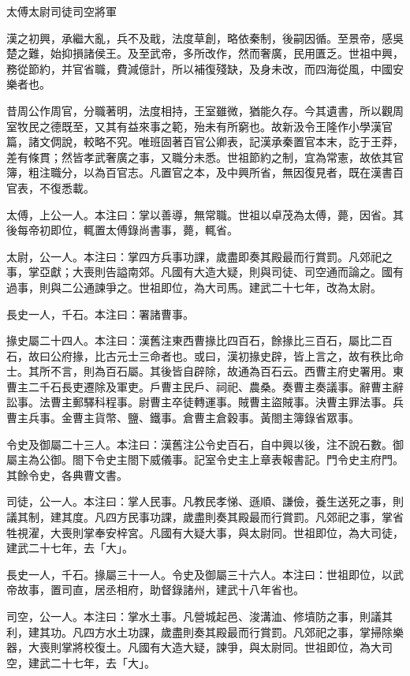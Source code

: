 
\begin{pinyinscope}
太傅太尉司徒司空將軍

漢之初興，承繼大亂，兵不及戢，法度草創，略依秦制，後嗣因循。至景帝，感吳楚之難，始抑損諸侯王。及至武帝，多所改作，然而奢廣，民用匱乏。世祖中興，務從節約，并官省職，費減億計，所以補復殘缺，及身未改，而四海從風，中國安樂者也。

昔周公作周官，分職著明，法度相持，王室雖微，猶能久存。今其遺書，所以觀周室牧民之德既至，又其有益來事之範，殆未有所窮也。故新汲令王隆作小學漢官篇，諸文倜說，較略不究。唯班固著百官公卿表，記漢承秦置官本末，訖于王莽，差有條貫；然皆孝武奢廣之事，又職分未悉。世祖節約之制，宜為常憲，故依其官簿，粗注職分，以為百官志。凡置官之本，及中興所省，無因復見者，既在漢書百官表，不復悉載。

太傅，上公一人。本注曰：掌以善導，無常職。世祖以卓茂為太傅，薨，因省。其後每帝初即位，輒置太傅錄尚書事，薨，輒省。

太尉，公一人。本注曰：掌四方兵事功課，歲盡即奏其殿最而行賞罰。凡郊祀之事，掌亞獻；大喪則告謚南郊。凡國有大造大疑，則與司徒、司空通而論之。國有過事，則與二公通諫爭之。世祖即位，為大司馬。建武二十七年，改為太尉。

長史一人，千石。本注曰：署諸曹事。

掾史屬二十四人。本注曰：漢舊注東西曹掾比四百石，餘掾比三百石，屬比二百石，故曰公府掾，比古元士三命者也。或曰，漢初掾史辟，皆上言之，故有秩比命士。其所不言，則為百石屬。其後皆自辟除，故通為百石云。西曹主府史署用。東曹主二千石長吏遷除及軍吏。戶曹主民戶、祠祀、農桑。奏曹主奏議事。辭曹主辭訟事。法曹主郵驛科程事。尉曹主卒徒轉運事。賊曹主盜賊事。決曹主罪法事。兵曹主兵事。金曹主貨幣、鹽、鐵事。倉曹主倉穀事。黃閤主簿錄省眾事。

令史及御屬二十三人。本注曰：漢舊注公令史百石，自中興以後，注不說石數。御屬主為公御。閤下令史主閤下威儀事。記室令史主上章表報書記。門令史主府門。其餘令史，各典曹文書。

司徒，公一人。本注曰：掌人民事。凡教民孝悌、遜順、謙儉，養生送死之事，則議其制，建其度。凡四方民事功課，歲盡則奏其殿最而行賞罰。凡郊祀之事，掌省牲視濯，大喪則掌奉安梓宮。凡國有大疑大事，與太尉同。世祖即位，為大司徒，建武二十七年，去「大」。

長史一人，千石。掾屬三十一人。令史及御屬三十六人。本注曰：世祖即位，以武帝故事，置司直，居丞相府，助督錄諸州，建武十八年省也。

司空，公一人。本注曰：掌水土事。凡營城起邑、浚溝洫、修墳防之事，則議其利，建其功。凡四方水土功課，歲盡則奏其殿最而行賞罰。凡郊祀之事，掌掃除樂器，大喪則掌將校復土。凡國有大造大疑，諫爭，與太尉同。世祖即位，為大司空，建武二十七年，去「大」。


\end{pinyinscope}
